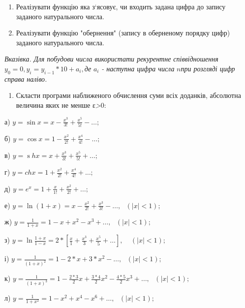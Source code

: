 \documentclass[]{article}
\begin{document}
\begin{enumerate}
\def\labelenumi{\arabic{enumi})}
\item
  Реалізувати функцію яка з`ясовує, чи входить задана цифра до запису
  заданого натурального числа.
\item
  Реалізувати функцію "обернення" (запису в оберненому порядку цифр)
  заданого натурального числа.
\end{enumerate}

\emph{\emph{Вказівка. Для побудови числа використати рекурентне
співвідношення}} \(y_{0} = 0,y_{i} = y_{i - 1}*10 + a_{i},\)\emph{де}
\(a_{i}\) \emph{- наступна цифра числа} \(n\)\emph{при розгляді цифр
справа наліво.}

\begin{enumerate}
\def\labelenumi{\arabic{enumi})}
\item
  Скласти програми наближеного обчислення суми всіх доданків, абсолютна
  величина яких не менше ε\emph{\textgreater{}}0:
\end{enumerate}

а) \(y = \sin x = x - \frac{x^{3}}{3!} + \frac{x^{5}}{5!} - \ldots;\)

б) \(y = \cos x = 1 - \frac{x^{2}}{2!} + \frac{x^{4}}{4!} - \ldots;\)

в)
\(y = \operatorname{s}hx = x + \frac{x^{3}}{3!} + \frac{x^{5}}{5!} + \ldots;\)

г) \(y = chx = 1 + \frac{x^{2}}{2!} + \frac{x^{4}}{4!} + \ldots;\)

д) \(y = e^{x} = 1 + \frac{x}{1!} + \frac{x^{2}}{2!} + \ldots;\)

е)
\(y = \ln(1 + x) = x - \frac{x^{2}}{2!} + \frac{x^{3}}{3!} - \ldots,\mathrm{\text{\ \ \ \ \ }}(\left| x \right| < 1);\)

ж)
\(y = \frac{1}{1 + x} = 1 - x + x^{2} - x^{3} + \ldots,\mathrm{\text{\ \ \ \ \ }}(\left| x \right| < 1);\)

з)
\(y = \ln\frac{1 + x}{1 - x} = 2*\left\lbrack \frac{x}{1} + \frac{x^{3}}{3} + \frac{x^{5}}{5} + \ldots \right\rbrack\mathrm{,\ \ \ \ \ }(\left| x \right| < 1);\)

і)
\(y = \frac{1}{(1 + x)^{2}} = 1 - 2*x + 3*x^{2} - \ldots,\mathrm{\text{\ \ \ \ \ }}(\left| x \right| < 1);\)

к)
\(y = \frac{1}{(1 + x)^{3}} = 1 - \frac{2*3}{2}x + \frac{3*4}{2}x^{2} - \frac{4*5}{2}x^{3} + \ldots,\mathrm{\text{\ \ \ \ \ }}(\left| x \right| < 1);\)

л)
\(y = \frac{1}{1 + x^{2}} = 1 - x^{2} + x^{4} - x^{6} + \ldots,\mathrm{\text{\ \ \ \ \ }}(\left| x \right| < 1);\)
\end{document}
